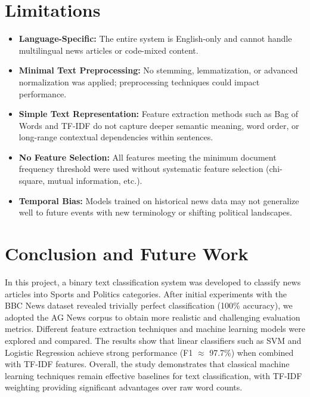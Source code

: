 \documentclass[12pt]{article}
\begin{document}
\section{Limitations}
\begin{itemize}
   \item \textbf{Language-Specific:}  The entire system is English-only and cannot handle multilingual news articles or code-mixed content.

\item \textbf{Minimal Text Preprocessing:} No stemming, lemmatization, or advanced normalization was applied; preprocessing techniques could impact performance.

\item \textbf{Simple Text Representation:} Feature extraction methods such as Bag of Words and TF-IDF do not capture deeper semantic meaning, word order, or long-range contextual dependencies within sentences.

\item \textbf{No Feature Selection:} All features meeting the minimum document frequency threshold were used without systematic feature selection (chi-square, mutual information, etc.).

\item \textbf{Temporal Bias:} Models trained on historical news data may not generalize well to future events with new terminology or shifting political landscapes.

\end{itemize}

\section{Conclusion and Future Work}

In this project, a binary text classification system was developed to classify news articles into Sports and Politics categories. After initial experiments with the BBC News dataset revealed trivially perfect classification (100\% accuracy), we adopted the AG News corpus to obtain more realistic and challenging evaluation metrics. Different feature extraction techniques and machine learning models were explored and compared. The results show that linear classifiers such as SVM and Logistic Regression achieve strong performance (F1 $\approx$ 97.7\%) when combined with TF-IDF features. Overall, the study demonstrates that classical machine learning techniques remain effective baselines for text classification, with TF-IDF weighting providing significant advantages over raw word counts.
\end{document}
